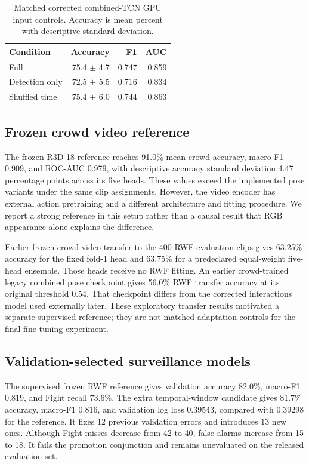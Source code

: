 \documentclass[journal]{IEEEtai}
\begin{document}
\begin{table}[t]
\caption{Matched corrected combined-TCN GPU input controls. Accuracy is mean percent with descriptive standard deviation.}
\label{tab:controls}\centering
\begin{tabular}{lrrr}
\toprule
Condition & Accuracy & F1 & AUC\\
\midrule
Full & 75.4 $\pm$ 4.7 & 0.747 & 0.859\\
Detection only & 72.5 $\pm$ 5.5 & 0.716 & 0.834\\
Shuffled time & 75.4 $\pm$ 6.0 & 0.744 & 0.863\\
\bottomrule
\end{tabular}
\end{table}



\subsection{Frozen crowd video reference}
The frozen R3D-18 reference reaches 91.0\% mean crowd accuracy, macro-F1 0.909, and ROC-AUC 0.979, with descriptive accuracy standard deviation 4.47 percentage points across its five heads. These values exceed the implemented pose variants under the same clip assignments. However, the video encoder has external action pretraining and a different architecture and fitting procedure. We report a strong reference in this setup rather than a causal result that RGB appearance alone explains the difference.

Earlier frozen crowd-video transfer to the 400 RWF evaluation clips gives 63.25\% accuracy for the fixed fold-1 head and 63.75\% for a predeclared equal-weight five-head ensemble. Those heads receive no RWF fitting. An earlier crowd-trained legacy combined pose checkpoint gives 56.0\% RWF transfer accuracy at its original threshold 0.54. That checkpoint differs from the corrected interactions model used externally later. These exploratory transfer results motivated a separate supervised reference; they are not matched adaptation controls for the final fine-tuning experiment.

\subsection{Validation-selected surveillance models}
The supervised frozen RWF reference gives validation accuracy 82.0\%, macro-F1 0.819, and Fight recall 73.6\%. The extra temporal-window candidate gives 81.7\% accuracy, macro-F1 0.816, and validation log loss 0.39543, compared with 0.39298 for the reference. It fixes 12 previous validation errors and introduces 13 new ones. Although Fight misses decrease from 42 to 40, false alarms increase from 15 to 18. It fails the promotion conjunction and remains unevaluated on the released evaluation set.
\end{document}

